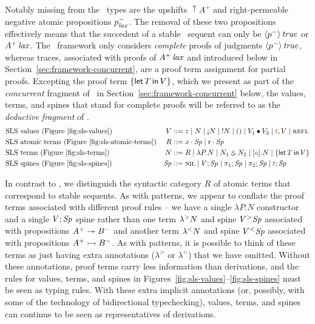Notably missing from the \sls~types are the upshifts ${\uparrow}A^+$
and right-permeable negative atomic propositions $p^-_{\it lax}$. The
removal of these two propositions effectively means that the succedent
of a stable \sls~sequent can only be ${\langle {p^-} \rangle}\,{{\it true}}$ or
${A^+}\,{{\it lax}}$. The \sls~framework only considers {\it complete} proofs
of judgments ${\langle {p^-} \rangle}\,{{\it true}}$, whereas traces, associated with
proofs of ${A^+}\,{{\it lax}}$ and introduced below in
Section~\ref{sec:framework-concurrent}, are a proof term assignment
for partial proofs. Excepting the proof term $\{{\sf let}\,{T}\,{\sf in}\, {V} \}$, which we
present as part of the {\it concurrent} fragment of \sls~in
Section~\ref{sec:framework-concurrent} below, the values, terms, and
spines that stand for complete proofs will be referred to as the {\it
  deductive fragment} of \sls.
\begin{align*}
&\mbox{\sls~values (Figure~\ref{fig:sls-values})}& 
V & ::= z
   \mid N
   \mid \tgnabr{N}
   \mid \tbangr{N}
   \mid \toner
   \mid \tfuser{V_1}{V_2}
   \mid \texistsr{\lf{t}}{V}
   \mid \tunifr
\\
&\mbox{\sls~atomic terms (Figure~\ref{fig:sls-atomic-terms})}&
R & ::= \tfocusl{x}{\Sp} 
   \mid \tfocusl{\sf r}{\Sp} 
\\
&\mbox{\sls~terms (Figure~\ref{fig:sls-terms})}&
N & ::= R
   \mid \lambda P.N 
   \mid N_1 \with N_2
   \mid \tforallr{\lf{a}}{N}
   \mid \tlet{T}{V}
\\
&\mbox{\sls~spines (Figure~\ref{fig:sls-spines})}&
\Sp & ::= \tnil 
   \mid V; \Sp
   \mid \pi_1; \Sp 
   \mid \pi_2; \Sp
   \mid \lf{t}; \Sp
\end{align*}

In contrast to \ollll, we distinguish the syntactic category $R$ of
atomic terms that correspond to stable sequents. As with patterns, we
appear to conflate the proof terms associated with different proof
rules -- we have a single $\lambda P.N$ constructor and a single
$V;{\it Sp}$ spine rather than one term ${\lambda}^{>}{N}$ and spine
${V}{^{>}}{{\it Sp}}$ associated with propositions $A^+ \twoheadrightarrow B^-$ and
another term ${\lambda}^{<}{N}$ and spine ${V}{^{<}}{{\it Sp}}$ associated with
propositions $A^+ \rightarrowtail B^-$.  As with patterns, it is possible to
think of these terms as just having extra annotations ($\lambda^>$ or
$\lambda^<$) that we have omitted.  Without these annotations, proof
terms carry less information than derivations, and the rules for
values, terms, and spines in
Figures~\ref{fig:sls-values}--\ref{fig:sls-spines} must be seen as
typing rules. With these extra implicit annotations (or, possibly,
with some of the technology of bidirectional typechecking), values,
terms, and spines can continue to be seen as representatives of
derivations.


